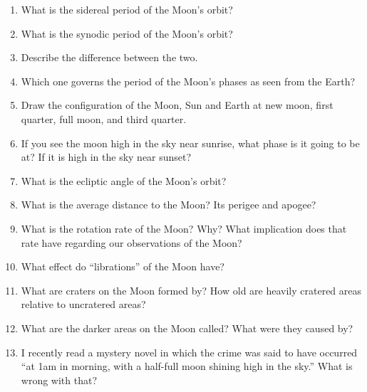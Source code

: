 
\begin{enumerate}
\item What is the sidereal period of the Moon's orbit?
\vspace{80pt}
\item What is the synodic period of the Moon's orbit?
\vspace{80pt}
\item Describe the difference between the two.
\vspace{80pt}
\item Which one governs the period of the Moon's phases as seen from
  the Earth?
\vspace{80pt}
\item Draw the configuration of the Moon, Sun and Earth at new moon,
  first quarter, full moon, and third quarter.
\vspace{120pt}
\item If you see the moon high in the sky near sunrise, what phase is
  it going to be at? If it is high in the sky near sunset?
\vspace{80pt}
\item What is the ecliptic angle of the Moon's orbit?
\vspace{80pt}
\item What is the average distance to the Moon? Its perigee and apogee?
\vspace{80pt}
\item What is the rotation rate of the Moon? Why? What implication
  does that rate have regarding our observations of the Moon?
\vspace{80pt}
\item What effect do ``librations'' of the Moon have?
\vspace{80pt}
\item What are craters on the Moon formed by? How old are heavily
  cratered areas relative to uncratered areas?
\vspace{80pt}
\item What are the darker areas on the Moon called? What were they
  caused by?
\vspace{80pt}
\item I recently read a mystery novel in which the crime was said to
  have occurred ``at 1am in morning, with a half-full moon shining
  high in the sky.'' What is wrong with that?
\vspace{80pt}
\end{enumerate}
